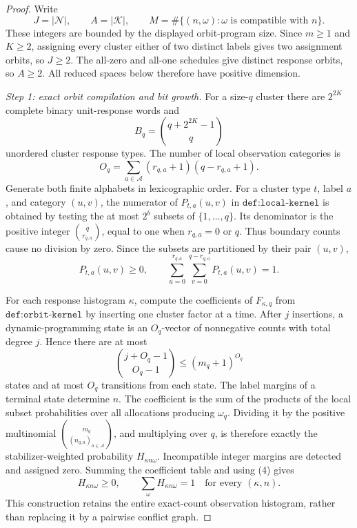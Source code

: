 \documentclass{article}
\begin{document}
\begin{proof}
Write
\[
 J=|\mathcal N|,
 \qquad A=|\mathcal K|,
 \qquad
 M=\#\{(n,\omega):\omega\text{ is compatible with }n\}.
\tag{1}
\]
These integers are bounded by the displayed orbit-program size.  Since \(m\ge1\) and \(K\ge2\), assigning every cluster either of two distinct labels gives two assignment orbits, so \(J\ge2\).  The all-zero and all-one schedules give distinct response orbits, so \(A\ge2\).  All reduced spaces below therefore have positive dimension.

\emph{Step 1: exact orbit compilation and bit growth.}
For a size-\(q\) cluster there are \(2^{2K}\) complete binary unit-response words and
\[
 B_q=\binom{q+2^{2K}-1}{q}
\tag{2}
\]
unordered cluster response types.  The number of local observation categories is
\[
 O_q=\sum_{a\in\mathcal A}(r_{q,a}+1)(q-r_{q,a}+1).
\tag{3}
\]
Generate both finite alphabets in lexicographic order.  For a cluster type \(t\), label \(a\), and category \((u,v)\), the numerator of \(P_{t,a}(u,v)\) in \(\texttt{def:local-kernel}\) is obtained by testing the at most \(2^b\) subsets of \(\{1,\ldots,q\}\).  Its denominator is the positive integer \(\binom q{r_{q,a}}\), equal to one when \(r_{q,a}=0\) or \(q\).  Thus boundary counts cause no division by zero.  Since the subsets are partitioned by their pair \((u,v)\),
\[
 P_{t,a}(u,v)\ge0,
 \qquad
 \sum_{u=0}^{r_{q,a}}\sum_{v=0}^{q-r_{q,a}}P_{t,a}(u,v)=1.
\tag{4}
\]

For each response histogram \(\kappa\), compute the coefficients of \(F_{\kappa,q}\) from \(\texttt{def:orbit-kernel}\) by inserting one cluster factor at a time.  After \(j\) insertions, a dynamic-programming state is an \(O_q\)-vector of nonnegative counts with total degree \(j\).  Hence there are at most
\[
 \binom{j+O_q-1}{O_q-1}\le (m_q+1)^{O_q}
\tag{5}
\]
states and at most \(O_q\) transitions from each state.  The label margins of a terminal state determine \(n\).  The coefficient is the sum of the products of the local subset probabilities over all allocations producing \(\omega_q\).  Dividing it by the positive multinomial \(\binom{m_q}{(n_{q,a})_{a\in\mathcal A}}\), and multiplying over \(q\), is therefore exactly the stabilizer-weighted probability \(H_{\kappa n\omega}\).  Incompatible integer margins are detected and assigned zero.  Summing the coefficient table and using (4) gives
\[
 H_{\kappa n\omega}\ge0,
 \qquad
 \sum_{\omega}H_{\kappa n\omega}=1
 \quad\text{for every }(\kappa,n).
\tag{6}
\]
This construction retains the entire exact-count observation histogram, rather than replacing it by a pairwise conflict graph.


\end{proof}
\end{document}
